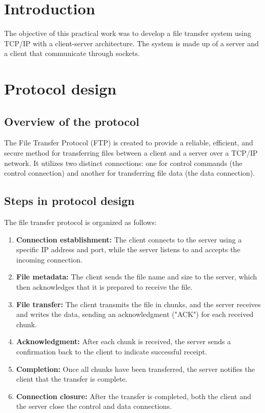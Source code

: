 \documentclass{article}
\begin{document}
\thispagestyle{empty}
    \newpage

\thispagestyle{empty}
    \newpage

\section{Introduction}
The objective of this practical work was to develop a file transfer system using TCP/IP with a client-server architecture. The system is made up of a server and a client that communicate through sockets.

\section{Protocol design}
\subsection{Overview of the protocol}
The File Transfer Protocol (FTP) is created to provide a reliable, efficient, and secure method for transferring files between a client and a server over a TCP/IP network. It utilizes two distinct connections: one for control commands (the control connection) and another for transferring file data (the data connection).

\subsection{Steps in protocol design}
The file transfer protocol is organized as follows:

\begin{enumerate}
    \item \textbf{Connection establishment:} The client connects to the server using a specific IP address and port, while the server listens to and accepts the incoming connection.
    \item \textbf{File metadata:} The client sends the file name and size to the server, which then acknowledges that it is prepared to receive the file.
    \item \textbf{File transfer:} The client transmits the file in chunks, and the server receives and writes the data, sending an acknowledgment ("ACK") for each received chunk.
    \item \textbf{Acknowledgment:} After each chunk is received, the server sends a confirmation back to the client to indicate successful receipt.
    \item \textbf{Completion:} Once all chunks have been transferred, the server notifies the client that the transfer is complete.
    \item \textbf{Connection closure:} After the transfer is completed, both the client and the server close the control and data connections.
\end{enumerate}
\end{document}
